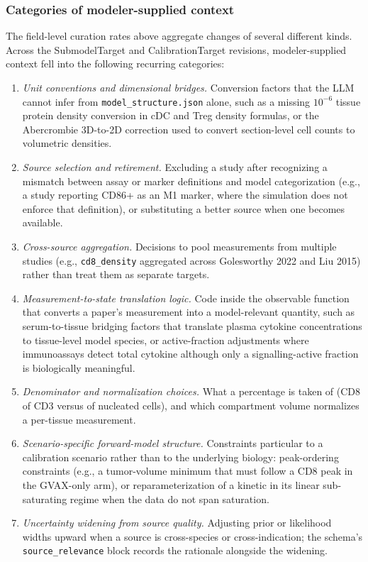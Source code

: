 \subsubsection{Categories of modeler-supplied context}
\label{sec:curation-categories}

The field-level curation rates above aggregate changes of several different kinds. Across the SubmodelTarget and CalibrationTarget revisions, modeler-supplied context fell into the following recurring categories:

\begin{enumerate}
  \item \emph{Unit conventions and dimensional bridges.} Conversion factors that the LLM cannot infer from \texttt{model\_structure.json} alone, such as a missing $10^{-6}$ tissue protein density conversion in cDC and Treg density formulas, or the Abercrombie 3D-to-2D correction used to convert section-level cell counts to volumetric densities.
  \item \emph{Source selection and retirement.} Excluding a study after recognizing a mismatch between assay or marker definitions and model categorization (e.g., a study reporting CD86+ as an M1 marker, where the simulation does not enforce that definition), or substituting a better source when one becomes available.
  \item \emph{Cross-source aggregation.} Decisions to pool measurements from multiple studies (e.g., \texttt{cd8\_density} aggregated across Golesworthy 2022 and Liu 2015) rather than treat them as separate targets.
  \item \emph{Measurement-to-state translation logic.} Code inside the observable function that converts a paper's measurement into a model-relevant quantity, such as serum-to-tissue bridging factors that translate plasma cytokine concentrations to tissue-level model species, or active-fraction adjustments where immunoassays detect total cytokine although only a signalling-active fraction is biologically meaningful.
  \item \emph{Denominator and normalization choices.} What a percentage is taken of (CD8 of CD3 versus of nucleated cells), and which compartment volume normalizes a per-tissue measurement.
  \item \emph{Scenario-specific forward-model structure.} Constraints particular to a calibration scenario rather than to the underlying biology: peak-ordering constraints (e.g., a tumor-volume minimum that must follow a CD8 peak in the GVAX-only arm), or reparameterization of a kinetic in its linear sub-saturating regime when the data do not span saturation.
  \item \emph{Uncertainty widening from source quality.} Adjusting prior or likelihood widths upward when a source is cross-species or cross-indication; the schema's \texttt{source\_relevance} block records the rationale alongside the widening.
\end{enumerate}

